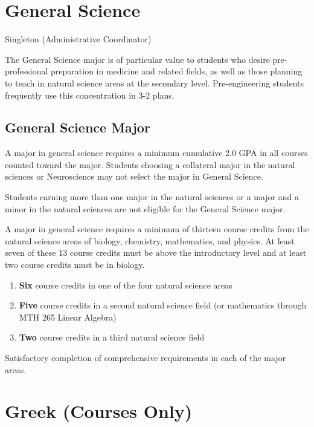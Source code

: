 \documentclass[
  letterpaper,
]{scrbook}
\providecommand{\tightlist}{%
  \setlength{\itemsep}{0pt}\setlength{\parskip}{0pt}}
\begin{document}
\section{General Science}\label{sec-general-science}

Singleton (Administrative Coordinator)

The General Science major is of particular value to students who desire
pre-professional preparation in medicine and related fields, as well as
those planning to teach in natural science areas at the secondary level.
Pre-engineering students frequently use this concentration in 3-2 plans.

\subsection{General Science Major}\label{general-science-major}

A major in general science requires a minimum cumulative 2.0 GPA in all
courses counted toward the major. Students choosing a collateral major
in the natural sciences or Neuroscience may not select the major in
General Science.

Students earning more than one major in the natural sciences or a major
and a minor in the natural sciences are not eligible for the General
Science major.

A major in general science requires a minimum of thirteen course credits
from the natural science areas of biology, chemistry, mathematics, and
physics. At least seven of these 13 course credits must be above the
introductory level and at least two course credits must be in biology.

\begin{enumerate}
\def\labelenumi{\arabic{enumi}.}
\tightlist
\item
  \textbf{Six} course credits in one of the four natural science areas
\item
  \textbf{Five} course credits in a second natural science field (or
  mathematics through MTH 265 Linear Algebra)
\item
  \textbf{Two} course credits in a third natural science field
\end{enumerate}

Satisfactory completion of comprehensive requirements in each of the
major areas.

\section{Greek (Courses Only)}\label{sec-greek}
\end{document}
